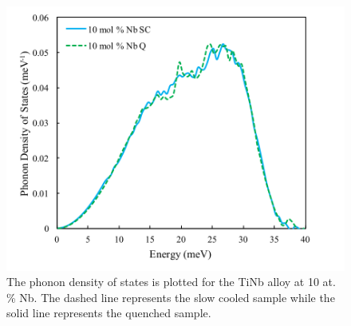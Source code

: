 \pagebreak
\begin{figure}[H]
	\centering
	\includegraphics[width=\textwidth]{Chapter-7/Figures/50dos_10.png}
	\caption{The phonon density of states is plotted for the TiNb alloy at 10 at. \% Nb. The dashed line represents the slow cooled sample while the solid line represents the quenched sample.}
	\label{Ch7-figure:50dos_10}
\end{figure}


